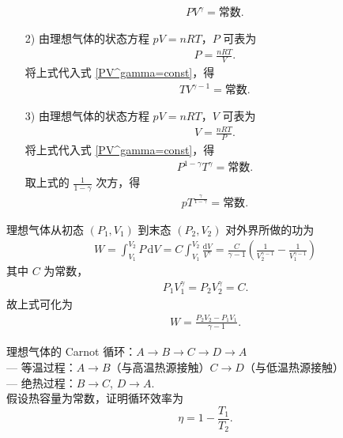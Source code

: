 \documentclass{assignment}
\begin{document}
\begin{sol}
\begin{itemize}
\begin{align}
            \label{PV^gamma=const}
            PV^{\gamma}=\text{常数}.
        \end{align}
        \item[2)] 由理想气体的状态方程 $pV=nRT$，$P$ 可表为
        \begin{align}
            P=\frac{nRT}{V}.
        \end{align}
        将上式代入式 \eqref{PV^gamma=const}，得
        \begin{align}
            TV^{\gamma-1}=\text{常数}.
        \end{align}
        \item[3)] 由理想气体的状态方程 $pV=nRT$，$V$ 可表为
        \begin{align}
            V=\frac{nRT}{P}.
        \end{align}
        将上式代入式 \eqref{PV^gamma=const}，得
        \begin{align}
            P^{1-\gamma}T^{\gamma}=\text{常数}.
        \end{align}
        取上式的 $\frac{1}{1-\gamma}$ 次方，得
        \begin{align}
            pT^{\frac{\gamma}{1-\gamma}}=\text{常数}.
        \end{align}
    \end{itemize}

    理想气体从初态 $(P_1,V_1)$ 到末态 $(P_2,V_2)$ 对外界所做的功为
    \begin{align}
        W=\int_{V_1}^{V_2} P\,\mathrm{d}V=C\int_{V_1}^{V_2}\frac{\mathrm{d}V}{V^{\gamma}}=\frac{C}{\gamma-1}\left(\frac{1}{V_2^{\gamma-1}}-\frac{1}{V_1^{\gamma-1}}\right)
    \end{align}
    其中 $C$ 为常数，
    \begin{align}
        P_1V_1^{\gamma}=P_2V_2^{\gamma}=C.
    \end{align}
    故上式可化为
    \begin{align}
        W=\frac{P_2V_2-P_1V_1}{\gamma-1}.
    \end{align}
\end{sol}

\begin{prob}
    理想气体的 Carnot 循环：$A\rightarrow B\rightarrow C\rightarrow D\rightarrow A$\\
    --- 等温过程：$A\rightarrow B$（与高温热源接触）$C\rightarrow D$（与低温热源接触）\\
    --- 绝热过程：$B\rightarrow C$, $D\rightarrow A$.\\
    假设热容量为常数，证明循环效率为
    \[
        \eta=1-\frac{T_1}{T_2}.
    \]
\end{prob}
\begin{pf}
    
\end{pf}
\end{document}
